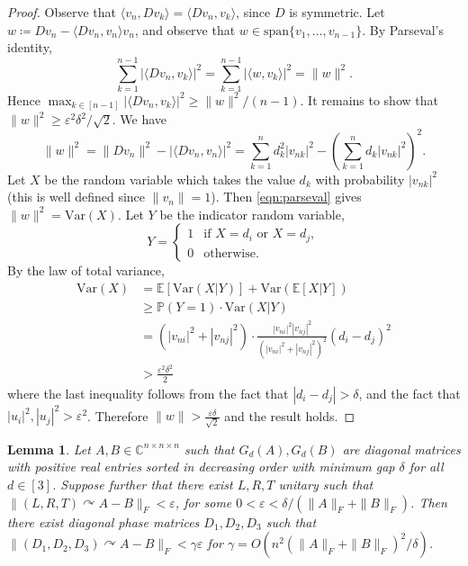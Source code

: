 \documentclass[11pt]{article}
\numberwithin{equation}{section}
\newtheorem{lemma}[theorem]{Lemma}
\theoremstyle{remark}
\newcommand{\C}{\mathbb{C}}
\newcommand{\E}{\mathbb{E}}
\newcommand{\angles}[1]{\langle#1\rangle}
\newcommand{\PP}{\mathbb{P}}
\begin{document}
\begin{proof}
Observe that $\langle v_n, Dv_k\rangle = \langle Dv_n, v_k\rangle$, since $D$ is symmetric. 
Let $w \coloneqq Dv_n-\angles{Dv_n,v_n}v_n$, and observe that $w\in \mathrm{span}\{v_1,\dots,v_{n-1}\}$.
By Parseval's identity, 
\begin{equation}\label{eqn:parseval}
    \sum_{k=1}^{n-1}|\angles{Dv_n,v_k}|^2=\sum_{k=1}^{n-1}|\angles{w,v_k}|^2=\|w\|^2.
\end{equation}
Hence $\max_{k\in [n-1]} |\angles{Dv_n,v_k}|^2\geq \|w\|^2/(n-1)$. 
It remains to show that $\|w\|^2 \geq \varepsilon^2\delta^2/\sqrt{2}$. 
We have 
\[\|w\|^2 = \|Dv_n\|^2 -|\angles{Dv_n,v_n}|^2=\sum_{k=1}^n d_k^2|v_{nk}|^2-\left(\sum_{k=1}^n d_k|v_{nk}|^2\right)^2.\]
Let $X$ be the random variable which takes the value $d_k$ with probability $|v_{nk}|^2$ (this is well
defined since $\|v_n\|=1$). Then \cref{eqn:parseval} gives $\|w\|^2=\mathrm{Var}(X)$.
Let $Y$ be the indicator random variable,
\[Y=\begin{cases}1 &\text{if } X=d_i\text{ or } X=d_j,\\ 0 & \text{otherwise.}\end{cases}\]
By the law of total variance, 
\begin{align*}
    \mathrm{Var}(X)&=\E[\mathrm{Var}(X|Y)] +\mathrm{Var}(\E[X|Y])\\
    &\geq \PP(Y=1)\cdot\mathrm{Var}(X|Y)\\
    &=(|v_{ni}|^2+|v_{nj}|^2) \cdot \frac{|v_{ni}|^2|v_{nj}|^2}{(|v_{ni}|^2+|v_{nj}|^2)^2}(d_i-d_j)^2\\
    &> \frac{\varepsilon^2\delta^2}{2}
\end{align*}
where the last inequality follows from the fact that $|d_i-d_j|>\delta$, and the fact that
$|u_i|^2,|u_j|^2>\varepsilon^2$.
Therefore $\|w\|>\frac{\varepsilon \delta}{\sqrt{2}}$ and the result holds.
\end{proof}

\begin{lemma}\label{lem:diagonalApproximation}
Let $A, B\in \C^{n\times n\times n}$ such that $G_d(A),G_d(B)$ are diagonal matrices with positive real entries sorted in decreasing order with minimum gap $\delta$ for all $d\in [3]$. Suppose further that there exist $L,R,T$ unitary such that $\|(L,R,T)\curvearrowright A- B\|_F<\varepsilon$, for some $0<\varepsilon < \delta/(\|A\|_F+\|B\|_F)$. Then there exist diagonal phase matrices $D_1,D_2,D_3$ such that $\|(D_1,D_2,D_3)\curvearrowright A- B\|_F< \gamma\varepsilon$ for $\gamma=O(n^2(\|A\|_F+\|B\|_F)^2/\delta)$.
\end{lemma}
\end{document}
